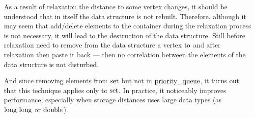 As a result of relaxation the distance to some vertex changes, it should be understood that in itself the data structure is not rebuilt. Therefore, although it may seem that add/delete elements to the container during the relaxation process is not necessary, it will lead to the destruction of the data structure. Still before relaxation need to remove from the data structure a vertex $\rm to$ and after relaxation then paste it back --- then no correlation between the elements of the data structure is not disturbed.

And since removing elements from $\rm set$ but not in $\rm priority\_queue$, it turns out that this technique applies only to $\rm set$. In practice, it noticeably improves performance, especially when storage distances uses large data types (as $\rm long\ long$ or $\rm double$).